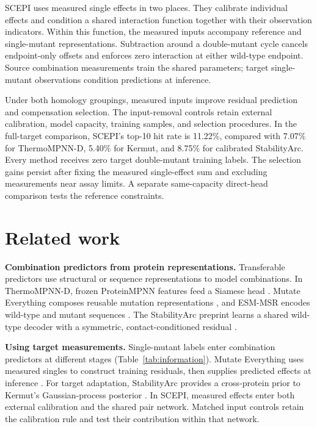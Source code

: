 \documentclass{llncs}
\begin{document}
SCEPI uses measured single effects in two places. They calibrate individual effects and condition a shared interaction function together with their observation indicators. Within this function, the measured inputs accompany reference and single-mutant representations. Subtraction around a double-mutant cycle cancels endpoint-only offsets and enforces zero interaction at either wild-type endpoint. Source combination measurements train the shared parameters; target single-mutant observations condition predictions at inference.

Under both homology groupings, measured inputs improve residual prediction and compensation selection. The input-removal controls retain external calibration, model capacity, training samples, and selection procedures. In the full-target comparison, SCEPI's top-10 hit rate is 11.22\%, compared with 7.07\% for ThermoMPNN-D, 5.40\% for Kermut, and 8.75\% for calibrated StabilityArc. Every method receives zero target double-mutant training labels. The selection gains persist after fixing the measured single-effect sum and excluding measurements near assay limits. A separate same-capacity direct-head comparison tests the reference constraints.

\section{Related work}

\noindent\textbf{Combination predictors from protein representations.} Transferable predictors use structural or sequence representations to model combinations. In ThermoMPNN-D, frozen ProteinMPNN features feed a Siamese head \citep{dieckhaus2025}. Mutate Everything composes reusable mutation representations \citep{ouyang2023}, and ESM-MSR encodes wild-type and mutant sequences \citep{reeves2026}. The StabilityArc preprint learns a shared wild-type decoder with a symmetric, contact-conditioned residual \citep{feller2026}.

\noindent\textbf{Using target measurements.} Single-mutant labels enter combination predictors at different stages (Table~\ref{tab:information}). Mutate Everything uses measured singles to construct training residuals, then supplies predicted effects at inference \citep{ouyang2023}. For target adaptation, StabilityArc provides a cross-protein prior to Kermut's Gaussian-process posterior \citep{feller2026,groth2024}. In SCEPI, measured effects enter both external calibration and the shared pair network. Matched input controls retain the calibration rule and test their contribution within that network.
\end{document}
